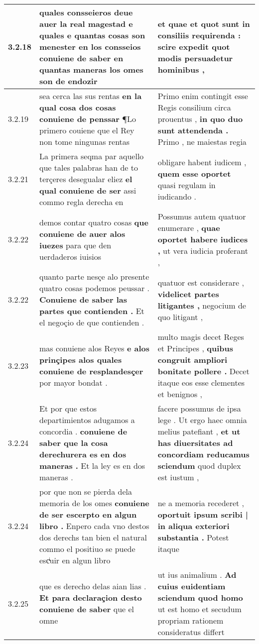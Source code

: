 \begin{tabular}{|p{1cm}|p{6.5cm}|p{6.5cm}|}
3.2.18 & quales consseieros deue auer la real magestad e quales e quantas cosas son menester en los consseios \textbf{ conuiene de saber } en quantas maneras los omes son de endozir & et quae et quot sunt in consiliis requirenda : \textbf{ scire expedit } quot modis persuadetur hominibus , \\\hline
3.2.19 & sea cerca las sus rentas \textbf{ en la qual cosa dos cosas conuiene de penssar } ¶Lo primero couiene que el Rey non tome ningunas rentas & Primo enim contingit esse Regis consilium circa prouentus , \textbf{ in quo duo sunt attendenda . } Primo , ne maiestas regia \\\hline
3.2.21 & La primera seqma par aquello que tales palabras han de to terçeres desegualar eliez \textbf{ el qual conuiene de ser } assi commo regla derecha en & obligare habent iudicem , \textbf{ quem esse oportet } quasi regulam in iudicando . \\\hline
3.2.22 & demos contar quatro cosas \textbf{ que conuiene de auer alos iuezes } para que den uerdaderos iuisios & Possumus autem quatuor enumerare , \textbf{ quae oportet habere iudices , } ut vera iudicia proferant , \\\hline
3.2.22 & quanto parte nesçe alo presente quatro cosas podemos peussar . \textbf{ Conuiene de saber las partes que contienden . } Et el negoçio de que contienden . & quatuor est considerare , \textbf{ videlicet partes litigantes , } negocium de quo litigant , \\\hline
3.2.23 & mas conuiene alos Reyes \textbf{ e alos prinçipes alos quales conuiene de resplandesçer } por mayor bondat . & multo magis decet Reges et Principes , \textbf{ quibus congruit ampliori bonitate pollere . } Decet itaque eos esse clementes et benignos , \\\hline
3.2.24 & Et por que estos departimientos adugamos a concordia . \textbf{ conuiene de saber que la cosa derechurera es en dos maneras . } Et la ley es en dos maneras . & facere possumus de ipsa lege . Ut ergo haec omnia melius patefiant , \textbf{ et ut has diuersitates ad concordiam reducamus sciendum } quod duplex est iustum , \\\hline
3.2.24 & por que non se pierda dela memoria de los omes \textbf{ conuiene de ser escerpto en algun libro . } Enpero cada vno destos dos derechs tan bien el natural commo el positiuo se puede escͥuir en algun libro & ne a memoria recederet , \textbf{ oportuit ipsum scribi | in aliqua exteriori substantia . } Potest itaque \\\hline
3.2.25 & que es derecho delas aian lias . \textbf{ Et para declaraçion desto conuiene de saber } que el omne & ut ius animalium . \textbf{ Ad cuius euidentiam sciendum quod homo } ut est homo et secudum propriam rationem consideratus differt \\\hline

\end{tabular}
